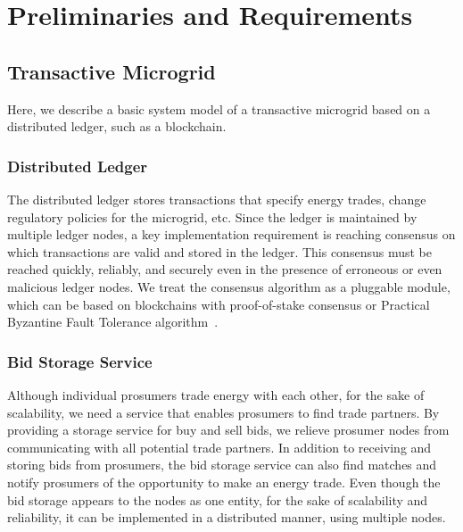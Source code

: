 \section{Preliminaries and Requirements}

\subsection{Transactive Microgrid}

Here, we describe a basic system model of a transactive microgrid based on a distributed ledger, such as a blockchain.

\subsubsection{Distributed Ledger}
The distributed ledger stores transactions that specify energy trades, change regulatory policies for the microgrid, etc.
Since the ledger is maintained by multiple ledger nodes, a key implementation requirement is reaching consensus on which transactions are valid and stored in the ledger.
This consensus must be reached quickly, reliably, and securely even in the presence of erroneous or even malicious ledger nodes.
We treat the consensus algorithm as a pluggable module, which can be based on blockchains with proof-of-stake consensus or Practical Byzantine Fault Tolerance algorithm~\cite{castro1999practical}.

\subsubsection{Bid Storage Service}
Although individual prosumers trade energy with each other, for the sake of scalability, we need a service that enables prosumers to find trade partners.
By providing a storage service for buy and sell bids, we relieve prosumer nodes from communicating with all potential trade partners.
In addition to receiving and storing bids from prosumers, the bid storage service can also find matches and notify prosumers of the opportunity to make an energy trade.
Even though the bid storage appears to the nodes as one entity, for the sake of scalability and reliability, it can be implemented in a distributed manner, using multiple nodes.

